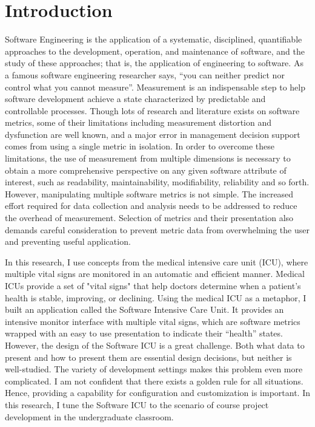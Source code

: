 
\chapter{Introduction}
Software Engineering is the application of a systematic, disciplined, quantifiable approaches to the development, operation, and maintenance of software, and the study of these approaches; that is, the application of engineering to software\cite{se-def}. As a famous software engineering researcher says, ``you can neither predict nor control what you cannot measure''\cite{DeMarco}. Measurement is an indispensable step to help software development achieve a state characterized by predictable and controllable processes. Though lots of research and literature exists on software metrics, some of their limitations including measurement distortion and dysfunction are well known, and a major error in management decision support comes from using a single metric in isolation. In order to overcome these limitations, the use of measurement from multiple dimensions is necessary to obtain a more comprehensive perspective on any given software attribute of interest, such as readability, maintainability, modifiability, reliability and so forth\cite{metrics2004}\cite{multidimension2001}. However, manipulating multiple software metrics is not simple. The increased effort required for data collection and analysis needs to be addressed to reduce the overhead of measurement. Selection of metrics and their presentation also demands careful consideration to prevent metric data from overwhelming the user and preventing useful application. 

In this research, I use concepts from the medical intensive care unit (ICU), where multiple vital signs are monitored in an automatic and efficient manner. Medical ICUs provide a set of "vital signs" that help doctors determine when a patient's health is stable, improving, or declining. Using the medical ICU as a metaphor, I built an application called the Software Intensive Care Unit. It provides an intensive monitor interface with multiple vital signs, which are software metrics wrapped with an easy to use presentation to indicate their ``health'' states. However, the design of the Software ICU is a great challenge. Both what data to present and how to present them are essential design decisions, but neither is well-studied. The variety of development settings makes this problem even more complicated. I am not confident that there exists a golden rule for all situations. Hence, providing a capability for configuration and customization is important. In this research, I tune the Software ICU to the scenario of course project development in the undergraduate classroom.

